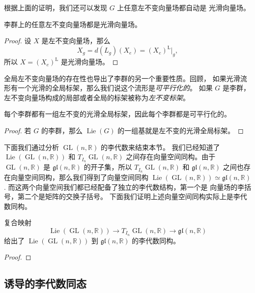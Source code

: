 \documentclass[fontset=none]{Notes}
\DeclareMathOperator\GL{GL}
\DeclareMathOperator\Lie{Lie}
\begin{document}
根据上面的证明，我们还可以发现 $G$ 上任意左不变向量场都自动是
光滑向量场。

\begin{corollary}
  李群上的任意左不变向量场都是光滑向量场。
\end{corollary}
\begin{proof}
  设 $X$ 是左不变向量场，那么
  \[
    X_g=d(L_g)(X_e)=(X_e)^{\mathrm{L}}\big|_g,
  \]
  所以 $X=(X_e)^{\mathrm{L}}$ 是光滑向量场。
\end{proof}

全局左不变向量场的存在性也导出了李群的另一个重要性质。回顾，
如果光滑流形有一个光滑的全局标架，那么我们说这个流形是\emph{可平行化的}。
如果 $G$ 是李群，左不变向量场构成的局部或者全局的标架被称为\emph{左不变标架}。

\begin{corollary}
  每个李群都有一组左不变的光滑全局标架，因此每个李群都是可平行化的。
\end{corollary}
\begin{proof}
  若 $G$ 的李群，那么 $\Lie(G)$ 的一组基就是左不变的光滑全局标架。
\end{proof}

下面我们通过分析 $\GL(n,\mathbb{R})$ 的李代数来结束本节。
我们已经知道了 $\Lie(\GL(n,\mathbb{R}))$ 和 $T_{I_n}\GL(n,\mathbb{R})$
之间存在向量空间同构。由于 $\GL(n,\mathbb{R})$ 是 $\mathfrak{gl}(n,\mathbb{R})$
的开子集，所以 $T_{I_n}\GL(n,\mathbb{R})$ 和 $\mathfrak{gl}(n,\mathbb{R})$
之间也存在向量空间同构，那么我们得到了向量空间同构
$\Lie(\GL(n,\mathbb{R}))\simeq \mathfrak{gl}(n,\mathbb{R})$.
而这两个向量空间我们都已经配备了独立的李代数结构，第一个是
向量场的李括号，第二个是矩阵的交换子括号。
下面我们证明上述向量空间同构实际上是李代数同构。

\begin{proposition}[一般线性群的李代数]
  复合映射
  \[
    \Lie(\GL(n,\mathbb{R}))\to T_{I_n}\GL(n,\mathbb{R})
    \to \mathfrak{gl}(n,\mathbb{R})  
  \]
  给出了 $\Lie(\GL(n,\mathbb{R}))$ 到 $\mathfrak{gl}(n,\mathbb{R})$
  的李代数同构。
\end{proposition}
\begin{proof}
  
\end{proof}

\subsection{诱导的李代数同态}
\end{document}
